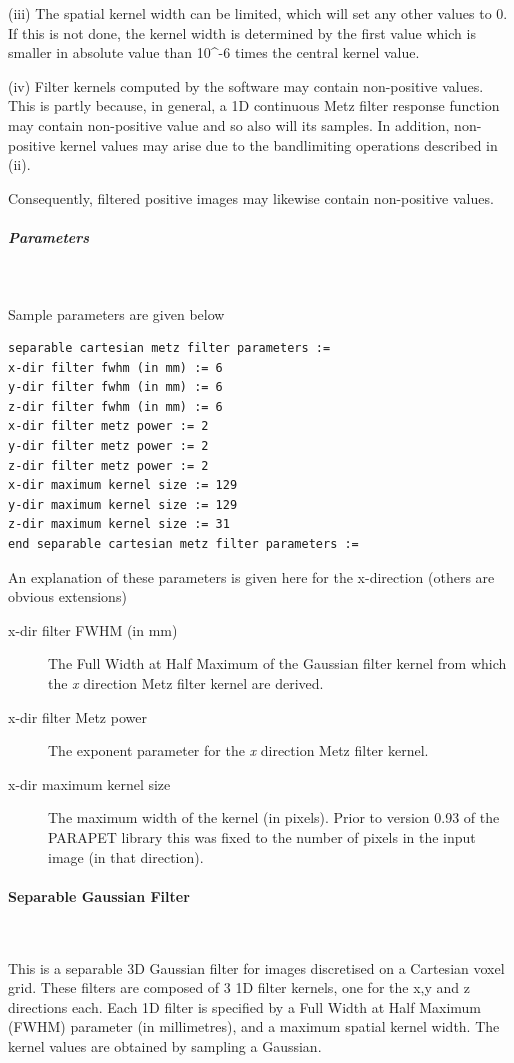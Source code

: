 \documentclass{article}
\newcommand{\subsubsubsection}[1]{\paragraph{#1}\mbox{} \\}
\newcommand{\subsubsubsubsection}[1]{\subparagraph{#1} \mbox{} \\}
\begin{document}
{{(iii) The spatial kernel width can be limited, which will set 
any other values to 0. If this is not done, the kernel width 
is determined by the first value which is smaller in absolute 
value than 10{\textasciicircum}-6 times the central kernel value.



(iv) Filter kernels computed by the software may contain non-positive 
values. This is partly because, in general, a 1D continuous Metz 
filter response function may contain non-positive value and so 
also will its samples. In addition, non-positive kernel values 
may arise due to the bandlimiting operations described in (ii). 



Consequently, filtered positive images may likewise contain non-positive 
values. 

{ \subsubsubsubsection{Parameters}
}
Sample parameters are given below
\begin{verbatim}
separable cartesian metz filter parameters :=
x-dir filter fwhm (in mm) := 6
y-dir filter fwhm (in mm) := 6
z-dir filter fwhm (in mm) := 6
x-dir filter metz power := 2
y-dir filter metz power := 2
z-dir filter metz power := 2
x-dir maximum kernel size := 129
y-dir maximum kernel size := 129
z-dir maximum kernel size := 31
end separable cartesian metz filter parameters := 
\end{verbatim}


An explanation of these parameters is given here for the x-direction 
(others are obvious extensions)
\begin{description}
\item[x-dir filter FWHM (in mm)]
The Full Width at Half Maximum of the Gaussian filter kernel 
from which the \textit{x} direction Metz filter kernel are derived.

\item[x-dir filter Metz power]
The exponent parameter for the \textit{x} direction Metz filter kernel.

\item[x-dir maximum kernel size]
The maximum width of the kernel (in pixels). Prior to version 
0.93 of the PARAPET library this was fixed to the number of pixels 
in the input image (in that direction).
\end{description}

{ \subsubsubsection{Separable Gaussian Filter}
}
This is a separable 3D Gaussian filter for images discretised on
a Cartesian voxel grid. These filters are composed of 3 1D filter
kernels, one for the x,y and z directions each. Each 1D filter
is specified by a Full Width at Half Maximum (FWHM) parameter
(in millimetres), and a maximum spatial kernel width.
The kernel values are obtained by sampling a Gaussian.

}}
\end{document}
